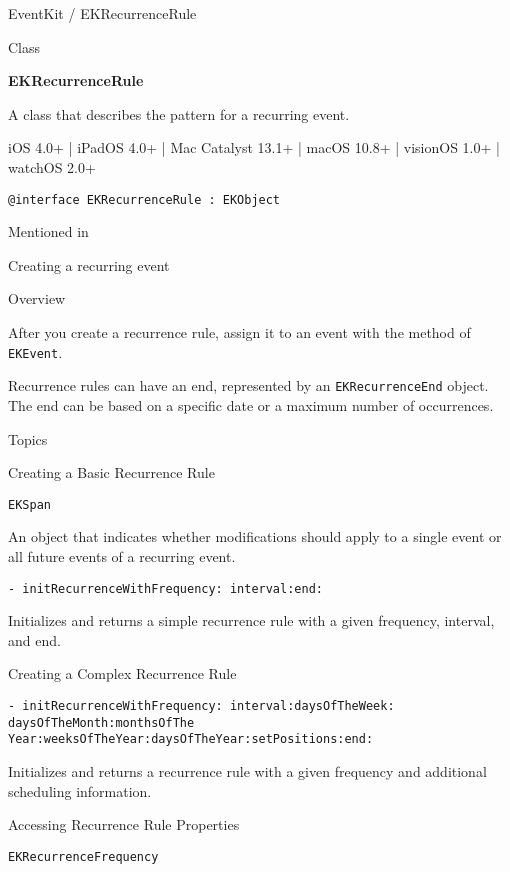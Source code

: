 \documentclass{article}
\title{}
\author{}
\date{}
\begin{document}
EventKit / EKRecurrenceRule

Class

\textbf{EKRecurrenceRule}

A class that describes the pattern for a recurring event.

iOS 4.0+ | iPadOS 4.0+ | Mac Catalyst 13.1+ | macOS 10.8+ | visionOS 1.0+ | watchOS 2.0+

\texttt{@interface EKRecurrenceRule : EKObject}

Mentioned in

Creating a recurring event

Overview

After you create a recurrence rule, assign it to an event with the method of \texttt{EKEvent}.

Recurrence rules can have an end, represented by an \texttt{EKRecurrenceEnd} object. The end can be based on a specific date or a maximum number of occurrences.

\noindent{}

Topics

Creating a Basic Recurrence Rule

\texttt{EKSpan}

An object that indicates whether modifications should apply to a single event or all future events of a recurring event.

\texttt{- initRecurrenceWithFrequency: interval:end:}

Initializes and returns a simple recurrence rule with a given frequency, interval, and end.

Creating a Complex Recurrence Rule

\texttt{- initRecurrenceWithFrequency: interval:daysOfTheWeek: daysOfTheMonth:monthsOfThe
Year:weeksOfTheYear:daysOfTheYear:setPositions:end:}

Initializes and returns a recurrence rule with a given frequency and additional scheduling information.

Accessing Recurrence Rule Properties

\texttt{EKRecurrenceFrequency}
\end{document}
